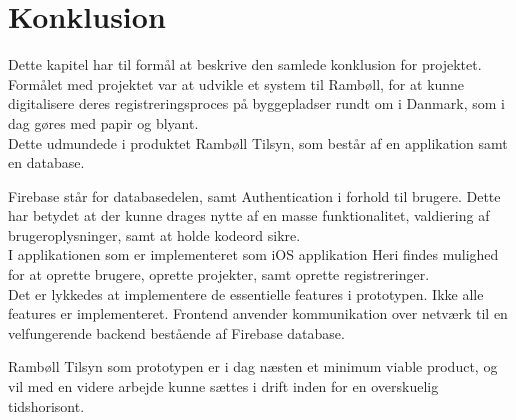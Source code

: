 \chapter{Konklusion}
Dette kapitel har til formål at beskrive den samlede 
konklusion for projektet. \\

Formålet med projektet var at udvikle et system til Rambøll, for at kunne digitalisere deres registreringsproces på byggepladser rundt om i Danmark, som i dag gøres med papir og blyant. \\
Dette udmundede i produktet Rambøll Tilsyn, som består af en applikation samt en database.

Firebase står for databasedelen, samt Authentication i forhold til brugere. Dette har betydet at der kunne drages nytte af en masse funktionalitet, valdiering af brugeroplysninger, samt at holde kodeord sikre. \\
I applikationen som er implementeret som iOS applikation
Heri findes mulighed for at oprette brugere, oprette projekter, samt oprette registreringer. \\
Det er lykkedes at implementere de essentielle features i prototypen.
Ikke alle features er implementeret. Frontend anvender kommunikation over netværk til en velfungerende backend bestående af Firebase database.


Rambøll Tilsyn som prototypen er i dag næsten et minimum viable product, og vil med en videre arbejde
kunne sættes i drift inden for en overskuelig tidshorisont.


